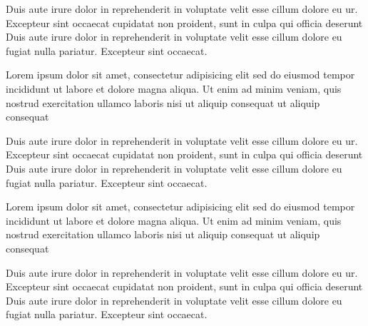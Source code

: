 \documentclass{article}
\begin{document}
\begin{pages}
\begin{Rightside}
Duis aute irure dolor in reprehenderit
in voluptate velit esse cillum dolore eu ur. Excepteur sint occaecat
cupidatat non proident, sunt in culpa qui officia deserunt
Duis aute irure dolor in reprehenderit
in voluptate velit esse cillum dolore eu fugiat nulla
pariatur. Excepteur sint occaecat.
\pend

Lorem ipsum dolor sit amet, consectetur adipisicing elit
sed do eiusmod tempor incididunt ut labore et dolore
magna aliqua. Ut enim ad minim veniam, quis nostrud
exercitation ullamco laboris nisi
ut aliquip consequat ut aliquip consequat
\pend

Duis aute irure dolor in reprehenderit
in voluptate velit esse cillum dolore eu ur. Excepteur sint occaecat
cupidatat non proident, sunt in culpa qui officia deserunt
Duis aute irure dolor in reprehenderit
in voluptate velit esse cillum dolore eu fugiat nulla
pariatur. Excepteur sint occaecat.
\pend

Lorem ipsum dolor sit amet, consectetur adipisicing elit
sed do eiusmod tempor incididunt ut labore et dolore
magna aliqua. Ut enim ad minim veniam, quis nostrud
exercitation ullamco laboris nisi
ut aliquip consequat ut aliquip consequat
\pend

Duis aute irure dolor in reprehenderit
in voluptate velit esse cillum dolore eu ur. Excepteur sint occaecat
cupidatat non proident, sunt in culpa qui officia deserunt
Duis aute irure dolor in reprehenderit
in voluptate velit esse cillum dolore eu fugiat nulla
pariatur. Excepteur sint occaecat.
\pend


\end{Rightside}
\end{pages}
\end{document}

